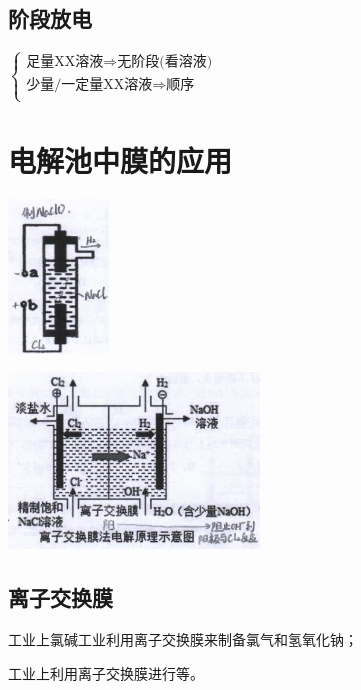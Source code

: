 \documentclass[10pt,cn]{elegantbook}
\begin{document}
	\subsection{阶段放电}
	
	$
	
	\left\{
	\begin{aligned}
		\text{足量XX溶液} \Rightarrow  	\text{无阶段(看溶液)} \\
		\text{少量/一定量XX溶液} \Rightarrow  	\text{顺序} \\
	\end{aligned}
	\right.
	$
	
	
	\section{电解池中膜的应用}
	
	
	\begin{center}
		\includegraphics[max width=0.2\textwidth]{image/c26-1.jpg}
	\end{center}
	
	
	\begin{center}
	\includegraphics[max width=0.5\textwidth]{image/c26-2.jpg}
	\end{center}
	
	
	\subsection{离子交换膜}
	
	工业上氯碱工业利用离子交换膜来制备氯气和氢氧化钠；
	
	工业上利用离子交换膜进行等。
	
\end{document}
